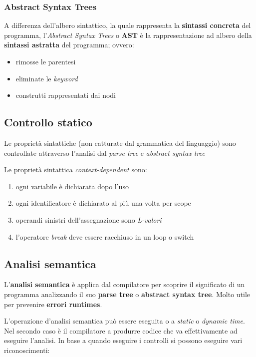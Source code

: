 \subsubsection{Abstract Syntax Trees}
\label{sec:ast}
A differenza dell'albero sintattico, la quale rappresenta la
\textbf{sintassi concreta} del programma, l'\textit{Abstract Syntax Trees} o
\textbf{AST} è la rappresentazione ad albero della \textbf{sintassi astratta}
del programma; ovvero:
\begin{itemize}
\item rimosse le parentesi
\item eliminate le \textit{keyword}
\item construtti rappresentati dai nodi
\end{itemize}

\subsection{Controllo statico}
Le proprietà sintattiche (non catturate dal grammatica del linguaggio) sono
controllate attraverso l'analisi dal \textit{parse tree} e
\textit{abstract syntax tree}

Le proprietà sintattica \textit{context-dependent} sono:
\begin{enumerate}
\item ogni variabile è dichiarata dopo l'uso
\item ogni identificatore è dichiarato al più una volta per scope
\item operandi sinistri dell'assegnazione sono \textit{L-valori}
\item l'operatore \textit{break} deve essere racchiuso in un loop o switch
\end{enumerate}

\subsection{Analisi semantica}
\begin{definition}
L'\textbf{analisi semantica} è applica dal compilatore per scoprire il
significato di un programma analizzando il suo \textbf{parse tree} o
\textbf{abstract syntax tree}. Molto utile per prevenire
\textbf{errori runtimes}.
\end{definition}

L'operazione d'analisi semantica può essere eseguita o a \textit{static} o
\textit{dynamic time}. Nel secondo caso è il compilatore a produrre codice che
va effettivamente ad eseguire l'analisi. In base a quando eseguire i controlli
si possono eseguire vari riconoscimenti:

